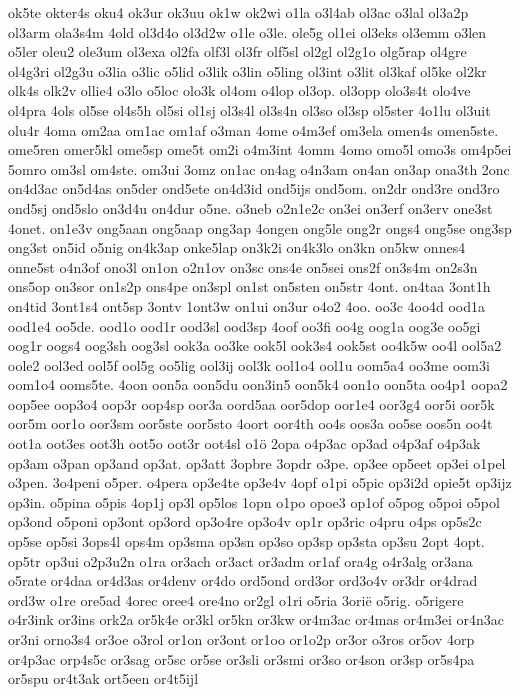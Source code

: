 {ok5te
okter4s
oku4
ok3ur
ok3uu
ok1w
ok2wi
o1la
o3l4ab
ol3ac
o3lal
ol3a2p
ol3arm
ola3s4m
4old
ol3d4o
ol3d2w
o1le
o3le.
ole5g
ol1ei
ol3eks
ol3emm
o3len
o5ler
oleu2
ole3um
ol3exa
ol2fa
olf3l
ol3fr
olf5sl
ol2gl
ol2g1o
olg5rap
ol4gre
ol4g3ri
ol2g3u
o3lia
o3lic
o5lid
o3lik
o3lin
o5ling
ol3int
o3lit
ol3kaf
ol5ke
ol2kr
olk4s
olk2v
ollie4
o3lo
o5loc
olo3k
ol4om
o4lop
ol3op.
ol3opp
olo3s4t
olo4ve
ol4pra
4ols
ol5se
ol4s5h
ol5si
ol1sj
ol3s4l
ol3s4n
ol3so
ol3sp
ol5ster
4o1lu
ol3uit
olu4r
4oma
om2aa
om1ac
om1af
o3man
4ome
o4m3ef
om3ela
omen4s
omen5ste.
ome5ren
omer5kl
ome5sp
ome5t
om2i
o4m3int
4omm
4omo
omo5l
omo3s
om4p5ei
5omro
om3sl
om4ste.
om3ui
3omz
on1ac
on4ag
o4n3am
on4an
on3ap
ona3th
2onc
on4d3ac
on5d4as
on5der
ond5ete
on4d3id
ond5ijs
ond5om.
on2dr
ond3re
ond3ro
ond5sj
ond5slo
on3d4u
on4dur
o5ne.
o3neb
o2n1e2c
on3ei
on3erf
on3erv
one3st
4onet.
on1e3v
ong5aan
ong5aap
ong3ap
4ongen
ong5le
ong2r
ongs4
ong5se
ong3sp
ong3st
on5id
o5nig
on4k3ap
onke5lap
on3k2i
on4k3lo
on3kn
on5kw
onnes4
onne5st
o4n3of
ono3l
on1on
o2n1ov
on3sc
ons4e
on5sei
ons2f
on3s4m
on2s3n
ons5op
on3sor
on1s2p
ons4pe
on3spl
on1st
on5sten
on5str
4ont.
on4taa
3ont1h
on4tid
3ont1s4
ont5sp
3ontv
1ont3w
on1ui
on3ur
o4o2
4oo.
oo3c
4oo4d
ood1a
ood1e4
oo5de.
ood1o
ood1r
ood3sl
ood3sp
4oof
oo3fi
oo4g
oog1a
oog3e
oo5gi
oog1r
oogs4
oog3sh
oog3sl
ook3a
oo3ke
ook5l
ook3s4
ook5st
oo4k5w
oo4l
ool5a2
oole2
ool3ed
ool5f
ool5g
oo5lig
ool3ij
ool3k
ool1o4
ool1u
oom5a4
oo3me
oom3i
oom1o4
ooms5te.
4oon
oon5a
oon5du
oon3in5
oon5k4
oon1o
oon5ta
oo4p1
oopa2
oop5ee
oop3o4
oop3r
oop4sp
oor3a
oord5aa
oor5dop
oor1e4
oor3g4
oor5i
oor5k
oor5m
oor1o
oor3sm
oor5ste
oor5sto
4oort
oor4th
oo4s
oos3a
oo5se
oos5n
oo4t
oot1a
oot3es
oot3h
oot5o
oot3r
oot4sl
o1ö
2opa
o4p3ac
op3ad
o4p3af
o4p3ak
op3am
o3pan
op3and
op3at.
op3att
3opbre
3opdr
o3pe.
op3ee
op5eet
op3ei
o1pel
o3pen.
3o4peni
o5per.
o4pera
op3e4te
op3e4v
4opf
o1pi
o5pic
op3i2d
opie5t
op3ijz
op3in.
o5pina
o5pis
4op1j
op3l
op5los
1opn
o1po
opoe3
op1of
o5pog
o5poi
o5pol
op3ond
o5poni
op3ont
op3ord
op3o4re
op3o4v
op1r
op3ric
o4pru
o4ps
op5s2c
op5se
op5si
3ops4l
ops4m
op3sma
op3sn
op3so
op3sp
op3sta
op3su
2opt
4opt.
op5tr
op3ui
o2p3u2n
o1ra
or3ach
or3act
or3adm
or1af
ora4g
o4r3alg
or3ana
o5rate
or4daa
or4d3as
or4denv
or4do
ord5ond
ord3or
ord3o4v
or3dr
or4drad
ord3w
o1re
ore5ad
4orec
oree4
ore4no
or2gl
o1ri
o5ria
3orië
o5rig.
o5rigere
o4r3ink
or3ins
ork2a
or5k4e
or3kl
or5kn
or3kw
or4m3ac
or4mas
or4m3ei
or4n3ac
or3ni
orno3s4
or3oe
o3rol
or1on
or3ont
or1oo
or1o2p
or3or
o3ros
or5ov
4orp
or4p3ac
orp4s5c
or3sag
or5sc
or5se
or3sli
or3smi
or3so
or4son
or3sp
or5s4pa
or5spu
or4t3ak
ort5een
or4t5ijl
}
